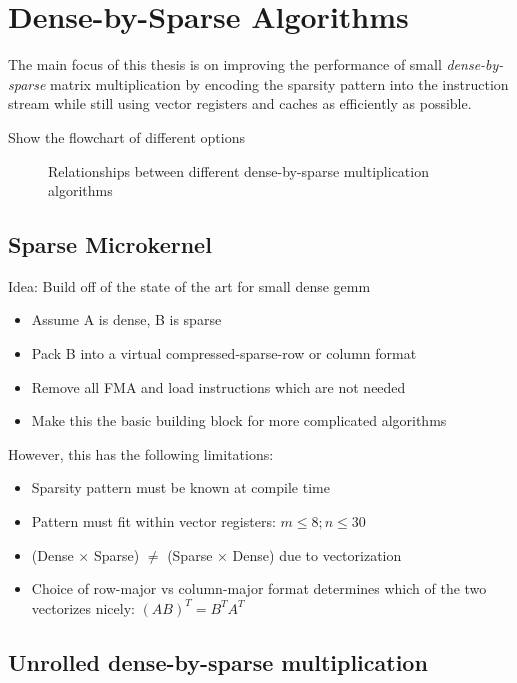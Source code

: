 \chapter{Dense-by-Sparse Algorithms}
\label{chapter:algs}

The main focus of this thesis is on improving the performance of small \emph{dense-by-sparse} matrix multiplication by encoding the sparsity pattern into the instruction stream while still using vector registers and caches as efficiently as possible. 


Show the flowchart of different options

\begin{figure}[H]
  \centering
  
  \label{fig:dxspfamilies}
  \caption{Relationships between different dense-by-sparse multiplication algorithms}
\end{figure}


\section{Sparse Microkernel}
Idea: Build off of the state of the art for small dense gemm
\begin{itemize}
    \item Assume A is dense, B is sparse
    \item Pack B into a virtual compressed-sparse-row or column format
    \item Remove all FMA and load instructions which are not needed
    \item Make this the basic building block for more complicated algorithms 
\end{itemize}

However, this has the following limitations:
\begin{itemize}
    \item Sparsity pattern must be known at compile time
    \item Pattern must fit within vector registers: $m \leq 8;  n \leq 30$
    \item (Dense $\times$ Sparse) $\neq$ (Sparse $\times$ Dense) due to vectorization
    \item Choice of row-major vs column-major format determines which of the two vectorizes nicely: $(AB)^T = B^T A^T$
\end{itemize}


\section{Unrolled dense-by-sparse multiplication}

